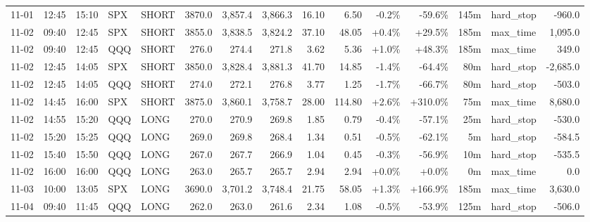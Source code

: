 \documentclass[11pt,a4paper,twoside]{article}
\begin{document}
\begin{landscape}
\begin{center}
\begin{longtable}{>{\color{txtmain}}l l l l l r r r r r r r r >{\color{txtmain}}l r}
11-01 & 12:45 & 15:10 & SPX & SHORT & 3870.0 & 3,857.4 & 3,866.3 & 16.10 & 6.50 & \textcolor{lossred}{-0.2\%} & \textcolor{lossred}{-59.6\%} & 145m & hard\_stop & \textcolor{lossred}{-960.0} \\
11-02 & 09:40 & 12:45 & SPX & SHORT & 3855.0 & 3,838.5 & 3,824.2 & 37.10 & 48.05 & \textcolor{wingreen}{+0.4\%} & \textcolor{wingreen}{+29.5\%} & 185m & max\_time & \textcolor{wingreen}{1,095.0} \\
11-02 & 09:40 & 12:45 & QQQ & SHORT & 276.0 & 274.4 & 271.8 & 3.62 & 5.36 & \textcolor{wingreen}{+1.0\%} & \textcolor{wingreen}{+48.3\%} & 185m & max\_time & \textcolor{wingreen}{349.0} \\
11-02 & 12:45 & 14:05 & SPX & SHORT & 3850.0 & 3,828.4 & 3,881.3 & 41.70 & 14.85 & \textcolor{lossred}{-1.4\%} & \textcolor{lossred}{-64.4\%} & 80m & hard\_stop & \textcolor{lossred}{-2,685.0} \\
11-02 & 12:45 & 14:05 & QQQ & SHORT & 274.0 & 272.1 & 276.8 & 3.77 & 1.25 & \textcolor{lossred}{-1.7\%} & \textcolor{lossred}{-66.7\%} & 80m & hard\_stop & \textcolor{lossred}{-503.0} \\
11-02 & 14:45 & 16:00 & SPX & SHORT & 3875.0 & 3,860.1 & 3,758.7 & 28.00 & 114.80 & \textcolor{wingreen}{+2.6\%} & \textcolor{wingreen}{+310.0\%} & 75m & max\_time & \textcolor{wingreen}{8,680.0} \\
11-02 & 14:55 & 15:20 & QQQ & LONG & 270.0 & 270.9 & 269.8 & 1.85 & 0.79 & \textcolor{lossred}{-0.4\%} & \textcolor{lossred}{-57.1\%} & 25m & hard\_stop & \textcolor{lossred}{-530.0} \\
11-02 & 15:20 & 15:25 & QQQ & LONG & 269.0 & 269.8 & 268.4 & 1.34 & 0.51 & \textcolor{lossred}{-0.5\%} & \textcolor{lossred}{-62.1\%} & 5m & hard\_stop & \textcolor{lossred}{-584.5} \\
11-02 & 15:40 & 15:50 & QQQ & LONG & 267.0 & 267.7 & 266.9 & 1.04 & 0.45 & \textcolor{lossred}{-0.3\%} & \textcolor{lossred}{-56.9\%} & 10m & hard\_stop & \textcolor{lossred}{-535.5} \\
11-02 & 16:00 & 16:00 & QQQ & LONG & 263.0 & 265.7 & 265.7 & 2.94 & 2.94 & \textcolor{wingreen}{+0.0\%} & \textcolor{wingreen}{+0.0\%} & 0m & max\_time & \textcolor{wingreen}{0.0} \\
11-03 & 10:00 & 13:05 & SPX & LONG & 3690.0 & 3,701.2 & 3,748.4 & 21.75 & 58.05 & \textcolor{wingreen}{+1.3\%} & \textcolor{wingreen}{+166.9\%} & 185m & max\_time & \textcolor{wingreen}{3,630.0} \\
11-04 & 09:40 & 11:45 & QQQ & LONG & 262.0 & 263.0 & 261.6 & 2.34 & 1.08 & \textcolor{lossred}{-0.5\%} & \textcolor{lossred}{-53.9\%} & 125m & hard\_stop & \textcolor{lossred}{-506.0} \\

\end{longtable}
\end{center}
\end{landscape}
\end{document}
